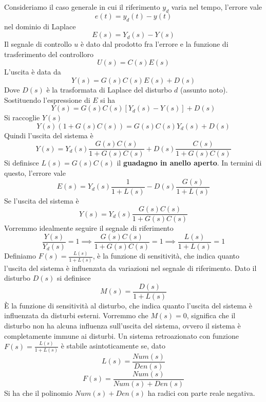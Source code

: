 \documentclass[10pt, letterpaper]{report}
\begin{document}
Consideriamo il caso generale in cui il riferimento $y_d$ varia nel tempo, l'errore vale 
 $$ e(t)=y_d(t)-y(t)$$
 nel dominio di Laplace 
$$E(s)=Y_d(s)-Y(s)$$
Il segnale di controllo $u$ è dato dal prodotto fra l'errore e la funzione di trasferimento del controlloro 
$$ U(s)=C(s)E(s)$$ 
L'uscita è data da 
$$Y(s)=G(s)C(s)E(s)+D(s)$$
Dove $D(s)$ è la trasformata di Laplace del disturbo $d$ (assunto noto).
Sostituendo l'espressione di $E$ si ha 
$$Y(s)=G(s)C(s)[Y_d(s)-Y(s)]+D(s)$$
Si raccoglie $Y(s)$
$$ Y(s)(1+G(s)C(s))=G(s)C(s)Y_d(s)+D(s)$$
Quindi l'uscita del sistema è 
$$ Y(s)=Y_d(s)\frac{G(s)C(s)}{1+G(s)C(s)}+D(s)\frac{C(s)}{1+G(s)C(s)}$$
Si definisce $L(s)=G(s)C(s)$ il \textbf{guadagno in anello aperto}. In termini di questo, l'errore vale 
$$ E(s)=Y_d(s)\frac{1}{1+L(s)}-D(s)\frac{G(s)}{1+L(s)}$$
Se l'uscita del sistema è 
$$ Y(s)=Y_d(s)\frac{G(s)C(s)}{1+G(s)C(s)}$$
Vorremmo idealmente seguire il segnale di riferimento $$\frac{Y(s)}{Y_d(s)}=1 \implies 
\frac{G(s)C(s)}{1+G(s)C(s)}=1\implies \frac{L(s)}{1+L(s)}=1$$
Definiamo $F(s)= \frac{L(s)}{1+L(s)}$, è la funzione di sensitività, che indica quanto l'uscita del sistema è influenzata da variazioni nel segnale di riferimento. Dato il disturbo $D(s)$ si definisce 
$$ M(s)=\frac{D(s)}{1+L(s)}$$
È la funzione di sensitività al disturbo, che indica quanto l'uscita del sistema è influenzata da disturbi esterni. Vorremmo che $M(s)=0$, significa che il disturbo non ha alcuna influenza sull'uscita del sistema, ovvero il sistema è completamente immune ai disturbi.
\acc 
Un sistema retroazionato con funzione $F(s)=\frac{L(s)}{1+L(s)}$ è stabile asintoticamente se, dato $$ L(s)=\frac{Num(s)}{Den(s)}$$
$$ F(s)=\frac{Num(s)}{Num(s)+Den(s)}$$ 
Si ha che il polinomio $Num(s)+Den(s)$ ha radici con parte reale negativa.
\end{document}
